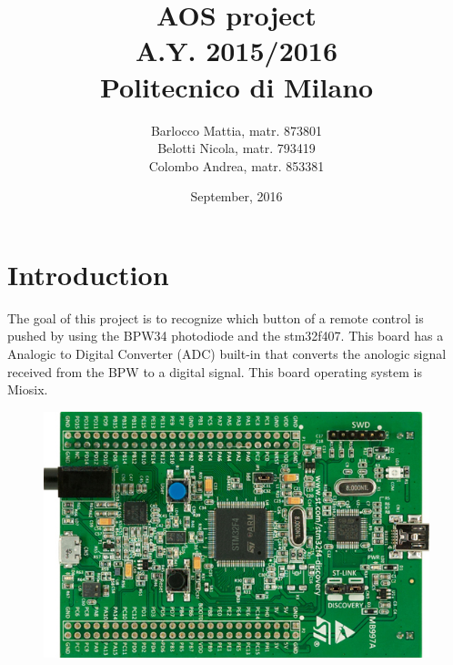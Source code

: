 \documentclass[18pt,oneside,a4paper, titlepage]{article}
\begin{document}
\title{\textbf{AOS project}\\ A.Y. 2015/2016\\
	Politecnico di Milano}	
\author{Barlocco Mattia, matr. 873801\\Belotti Nicola, matr. 793419\\Colombo Andrea, matr. 853381}
\date{September, 2016}
\maketitle

\newpage
\tableofcontents

\newpage
\section{Introduction}
	The goal of this project is to recognize which button of a remote control is pushed by using the BPW34 photodiode and the stm32f407. This board has a Analogic to Digital Converter (ADC) built-in that converts the anologic signal received from the BPW to a digital signal. This board operating system is Miosix.
	\begin{figure}[h]
		\centering
		\includegraphics[scale=0.6]{board.jpg}%
	\end{figure}
\newpage
\end{document}
